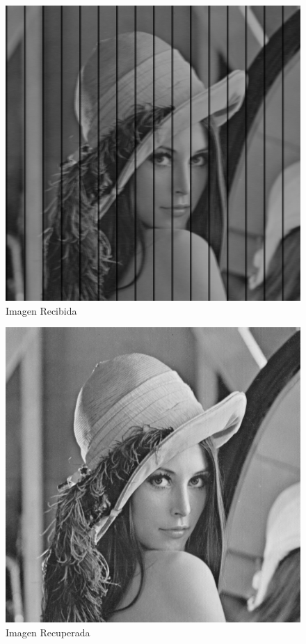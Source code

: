 \documentclass{article}
\begin{document}
\begin{multicols}{2}
\begin{figure}[H]
\centering
\includegraphics[scale=0.2]{../img/received_part4c.png}
\caption{Imagen Recibida}

\end{figure}

\begin{figure}[H]
\centering
\includegraphics[scale=0.2]{../img/corrected_part4c.png}
\caption{Imagen Recuperada}


\end{figure}
\end{multicols}
\end{document}
